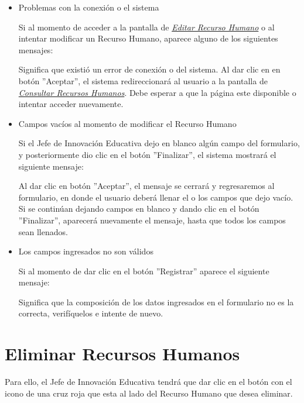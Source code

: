                 \begin{itemize}
                	\item Problemas con la conexión o el sistema

                    	Si al momento de acceder a la pantalla de \hyperlink{editarrh}{\textit{Editar Recurso Humano}} o al intentar modificar un Recurso Humano, aparece alguno de los siguientes mensajes:


                    	Significa que existió un error de conexión o del sistema. Al dar clic en en botón ''Aceptar'', el sistema redireccionará al usuario a la pantalla de \hyperlink{consultarrh}{\textit{Consultar Recursos Humanos}}. Debe esperar a que la página este disponible o intentar acceder nuevamente.

                	\item Campos vacíos al momento de modificar el Recurso Humano

                    	Si el Jefe de Innovación Educativa dejo en blanco algún campo del formulario, y posteriormente dio clic en el botón ''Finalizar'', el sistema mostrará el siguiente mensaje:


                	    Al dar clic en botón ''Aceptar'', el mensaje se cerrará y regresaremos al formulario, en donde el usuario deberá llenar el o los campos que dejo vacío. Si se continúan dejando campos en blanco y dando clic en el botón ''Finalizar'', aparecerá nuevamente el mensaje, hasta que todos los campos sean llenados.

                	\item Los campos ingresados no son válidos

                    	Si al momento de dar clic en el botón ''Registrar'' aparece el siguiente mensaje:

                    	Significa que la composición de los datos ingresados en el formulario no es la correcta, verifíquelos e intente de nuevo.

                \end{itemize}

        \section{Eliminar Recursos Humanos}

            Para ello, el Jefe de Innovación Educativa tendrá que dar clic en el botón con el icono de una cruz roja que esta al lado del Recurso Humano que desea eliminar.

